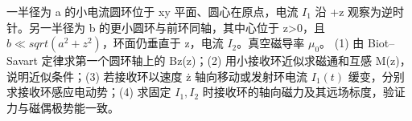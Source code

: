 一半径为 a 的小电流圆环位于 xy 平面、圆心在原点，电流 \(I_{1}\) 沿 +z 观察为逆时针。另一半径为 b 的更小圆环与前环同轴，其中心位于 z>0，且 \(b\ll sqrt(a^{2}+z^{2})\)，环面仍垂直于 z，电流 \(I_{2}\)。真空磁导率 \(\mu _{0}\)。
(1) 由 Biot–Savart 定律求第一个圆环轴上的 Bz(z)；(2) 用小接收环近似求磁通和互感 M(z)，说明近似条件；(3) 若接收环以速度 ż 轴向移动或发射环电流 \(I_{1}(t)\) 缓变，分别求接收环感应电动势；(4) 求固定 \(I_{1},I_{2}\) 时接收环的轴向磁力及其远场标度，验证力与磁偶极势能一致。
